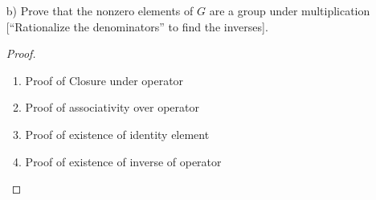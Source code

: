 \documentclass[11pt]{article}
\theoremstyle{definition}  %
\begin{document}
\begin{enumerate}
\begin{itemize}
\begin{proof}
\begin{enumerate}
      \item  Proof of existence of inverse of operator
    \end{enumerate}
  \end{proof}
   \item[b)] Prove that the nonzero elements of $G$ are a group under multiplication [``Rationalize the denominators'' to find the inverses].
   \begin{proof}
     \begin{enumerate}
       \item Proof of Closure under operator
       \item Proof of associativity over operator
       \item Proof of existence of identity element
       \item  Proof of existence of inverse of operator
     \end{enumerate}
   \end{proof}
  \end{itemize}
 \end{enumerate}
\end{document}
